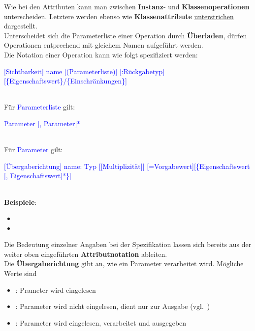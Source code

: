 \noindent
Wie bei den Attributen kann man zwischen \textbf{Instanz}- und \textbf{Klassenoperationen} unterscheiden.
Letztere werden ebenso wie \textbf{Klassenattribute} \underline{unterstrichen} dargestellt.\\

\noindent
Unterscheidet sich die Parameterliste einer Operation durch \textbf{Überladen}, dürfen Operationen entprechend mit gleichem Namen aufgeführt werden.\\

\noindent
Die Notation einer Operation kann wie folgt spezifiziert werden:

\medskip
\noindent
\begin{small}
    \textcolor{blue}{[Sichtbarkeit] name [(Parameterliste)] [:Rückgabetyp][\{Eigenschaftswert\}/\{Einschränkungen\}]}
\end{small}\\

\noindent
Für \textcolor{blue}{Parameterliste} gilt:\\
\begin{small}
    \textcolor{blue}{Parameter [, Parameter]*}\\
\end{small}\\


\noindent
Für \textcolor{blue}{Parameter} gilt:\\
\medskip
\noindent
\begin{small}
    \textcolor{blue}{[Übergaberichtung] name: Typ [[Multiplizität]] [=Vorgabewert][\{Eigenschaftswert [, Eigenschaftswert]*\}]}\\
\end{small}\\

\noindent
\textbf{Beispiele}:

\begin{itemize}
    \item[] 
    \item[] 
\end{itemize}

\noindent
Die Bedeutung einzelner Angaben bei der Spezifikation lassen sich bereits aus der weiter oben eingeführten \textbf{Attributnotation} ableiten.\\
Die \textbf{Übergaberichtung} gibt an, wie ein Parameter verarbeitet wird.
Mögliche Werte sind

\begin{itemize}
    \item {}: Prameter wird eingelesen
    \item {}: Parameter wird nicht eingelesen, dient nur zur Ausgabe (vgl.~\cite[24]{Buh09})
    \item {}: Parameter wird eingelesen, verarbeitet und ausgegeben
\end{itemize}

